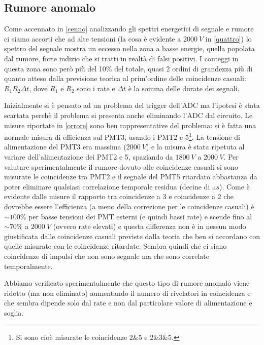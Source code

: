 \subsection{Rumore anomalo}
\label{rumore}

Come accennato in \autoref{cenno} analizzando gli spettri energetici di segnale e rumore ci siamo accorti che ad alte tensioni (la cosa è evidente a $\SI{2000}{V}$ in \autoref{quattro}) lo spettro del segnale mostra un eccesso nella zona a basse energie, quella popolata dal rumore, forte indizio che si tratti in realtà di falsi positivi. I conteggi in questa zona sono però più del 10\% del totale, quasi 2 ordini di grandezza più di quanto atteso dalla previsione teorica al prim'ordine delle coincidenze casuali: $R_1 R_2 \Delta t$, dove $R_1$ e $R_2$ sono i rate e $\Delta t$ è la somma delle durate dei segnali.

Inizialmente si è pensato ad un problema del trigger dell'ADC ma l'ipotesi è stata scartata perchè il problema si presenta anche eliminando l'ADC dal circuito. Le misure riportate in \autoref{orrore} sono ben rappresentative del problema: si è fatta una normale misura di efficienza sul PMT3, usando i PMT2 e 5\footnote{Si sono cioè misurate le coincidenze 2\&5 e 2\&3\&5.}. La tensione di alimentazione del PMT3 era massima ($\SI{2000}{V}$) e la misura è stata ripetuta al variare dell'alimentazione dei PMT2 e 5, spaziando da $\SI{1800}{V}$ a $\SI{2000}{V}$. Per valutare sperimentalmente il rumore dovuto alle coincidenze casuali si sono misurate le coincidenze tra PMT2 e il segnale del PMT5 ritardato abbastanza da poter eliminare qualsiasi correlazione temporale residua (decine di $\si{\micro s}$).
Come è evidente dalle misure il rapporto tra coincidenze a 3 e coincidenze a 2 che dovrebbe essere l'efficienza (a meno della correzione per le coincidenze casuali) è $\sim 100\%$ per basse tensioni dei PMT esterni (e quindi bassi rate) e scende fino al $\sim 70\%$ a $\SI{2000}{V}$ (ovvero rate elevati) e questa differenza non è in nessun modo giustificata dalle coincidenze casuali previste dalla teoria che ben si accordano con quelle misurate con le coincidenze ritardate. Sembra quindi che ci siano coincidenze di impulsi che non sono segnale ma che sono correlate temporalmente.

Abbiamo verificato sperimentalmente che questo tipo di rumore anomalo viene ridotto (ma non eliminato) aumentando il numero di rivelatori in coincidenza e che sembra dipende solo dal rate e non dal particolare valore di alimentazione e soglia.


